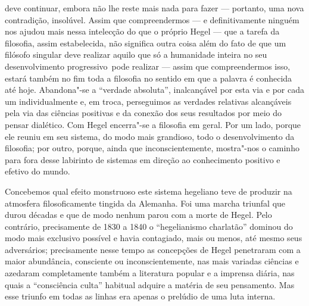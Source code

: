 deve continuar, embora não lhe reste mais nada para fazer --- portanto,
uma nova contradição, insolúvel. Assim que compreendermos --- e
definitivamente ninguém nos ajudou mais nessa intelecção do que o
próprio Hegel ---
que a tarefa da filosofia, assim estabelecida, não significa outra coisa
além do fato de que um filósofo singular deve realizar aquilo que só a
humanidade inteira no seu desenvolvimento progressivo\est\ pode realizar ---
assim que compreendermos isso, estará também no fim toda a filosofia no
sentido em que a palavra é conhecida até hoje. Abandona"-se a ``verdade
absoluta'', inalcançável por esta via e por cada um individualmente e,
em troca, perseguimos as verdades relativas alcançáveis pela via das
ciências positivas e da conexão dos seus resultados por meio do pensar
dialético.
Com Hegel
encerra"-se a filosofia em geral. Por um lado, porque ele reuniu em seu
sistema, do modo mais grandioso, todo o desenvolvimento da filosofia;
por outro, porque, ainda que inconscientemente, mostra"-nos o caminho
para fora desse labirinto de sistemas em direção ao conhecimento
positivo e efetivo do mundo.

Concebemos qual efeito monstruoso este sistema hegeliano teve de
produzir na atmosfera filosoficamente tingida da Alemanha. Foi uma
marcha triunfal que durou décadas e que de modo nenhum parou com a morte
de Hegel.
Pelo contrário, precisamente de 1830 a 1840 o ``hegelianismo
charlatão'' dominou do modo mais exclusivo possível e 
havia contagiado, mais ou menos, até mesmo seus adversários;
precisamente nesse tempo as concepções
de Hegel penetraram
com a maior abundância, consciente ou inconscientemente, nas mais
variadas ciências e azedaram completamente também a literatura popular e
a imprensa diária, nas quais a ``consciência culta'' habitual adquire a
matéria de seu pensamento. Mas esse triunfo em todas as linhas era
apenas o prelúdio de uma luta interna.

